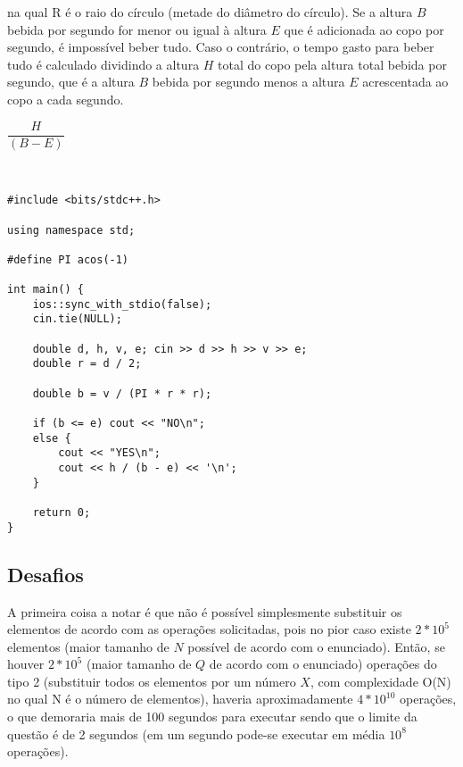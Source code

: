 \documentclass[11pt,fancychapters]{article}
\begin{document}
na qual R é o raio do círculo (metade do diâmetro do círculo). Se a altura $B$ bebida por segundo for menor ou igual à altura $E$ que é adicionada ao copo por segundo, é impossível beber tudo. Caso o contrário, o tempo gasto para beber tudo é calculado dividindo a altura $H$ total do copo pela altura total bebida por segundo, que é a altura $B$ bebida por segundo menos a altura $E$ acrescentada ao copo a cada segundo.
\begin{center}
\begin{math}
\dfrac{H}{(B - E)}
\end{math}
\end{center}\\
\begin{lstlisting}[style=c++]
#include <bits/stdc++.h>

using namespace std;

#define PI acos(-1)

int main() {
    ios::sync_with_stdio(false);
    cin.tie(NULL);
    
    double d, h, v, e; cin >> d >> h >> v >> e;
    double r = d / 2;
    
    double b = v / (PI * r * r);
    
    if (b <= e) cout << "NO\n";
    else {
        cout << "YES\n";
        cout << h / (b - e) << '\n';
    }

    return 0;
}
\end{lstlisting}
\newpage
\begin{center}\section{Desafios}\end{center}
\noindent
A primeira coisa a notar é que não é possível simplesmente substituir os elementos de acordo com as operações solicitadas, pois no pior caso existe $2*10^{5}$ elementos (maior tamanho de $N$ possível de acordo com o enunciado). Então, se houver $2*10^{5}$ (maior tamanho de $Q$ de acordo com o enunciado) operações do tipo 2 (substituir todos os elementos por um número $X$, com complexidade O(N) no qual N é o número de elementos), haveria aproximadamente $4*10^{10}$ operações, o que demoraria mais de 100 segundos para executar sendo que o limite da questão é de 2 segundos (em um segundo pode-se executar em média $10^{8}$ operações).
\end{document}
